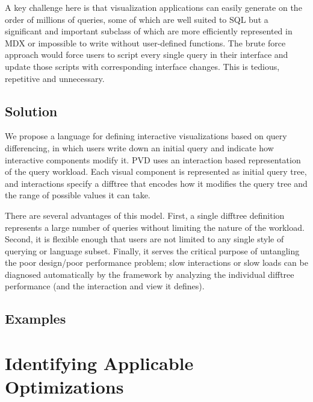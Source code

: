 A key challenge here is that visualization applications can easily generate on the order of millions of queries, some of which are well suited to SQL but a significant and important subclass of which are more efficiently represented in MDX or impossible to write without user-defined functions. The brute force approach would force users to script every single query in their interface and update those scripts with corresponding interface changes. This is tedious, repetitive and unnecessary. 

\subsection{Solution}
We propose a language for defining interactive visualizations based on query differencing, in which users write down an initial query and indicate how interactive components modify it. PVD uses an interaction based representation of the query workload. Each visual component is represented as initial query tree, and interactions specify a difftree that encodes how it modifies the query tree and the range of possible values it can take. 

There are several advantages of this model. First, a single difftree definition represents a large number of queries without limiting the nature of the workload. Second, it is flexible enough that users are not limited to any single style of querying or language subset. Finally, it serves the critical purpose of untangling the poor design/poor performance problem;  slow interactions or slow loads can be diagnosed automatically by the framework by analyzing the individual difftree performance (and the interaction and view it defines).

\subsection{Examples}

\section{Identifying Applicable Optimizations}
